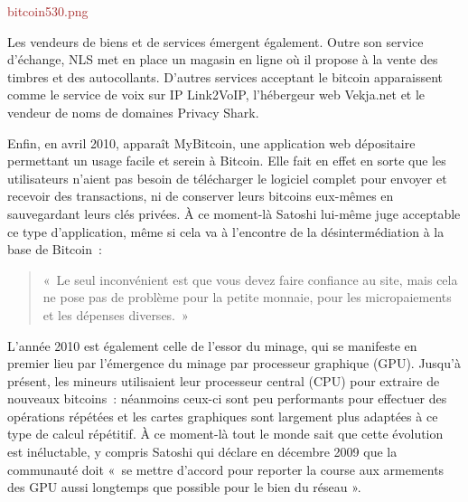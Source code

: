 \textcolor{brown}{bitcoin530.png}

Les vendeurs de biens et de services émergent également. Outre son service d'échange, NLS met en place un magasin en ligne où il propose à la vente des timbres et des autocollants. D'autres services acceptant le bitcoin apparaissent comme le service de voix sur IP Link2VoIP, l'hébergeur web Vekja.net et le vendeur de noms de domaines Privacy Shark.

Enfin, en avril 2010, apparaît MyBitcoin, une application web dépositaire permettant un usage facile et serein à Bitcoin. Elle fait en effet en sorte que les utilisateurs n'aient pas besoin de télécharger le logiciel complet pour envoyer et recevoir des transactions, ni de conserver leurs bitcoins eux-mêmes en sauvegardant leurs clés privées. À ce moment-là Satoshi lui-même juge acceptable ce type d'application, même si cela va à l'encontre de la désintermédiation à la base de Bitcoin~:

\begin{quote}
«~Le seul inconvénient est que vous devez faire confiance au site, mais cela ne pose pas de problème pour la petite monnaie, pour les micropaiements et les dépenses diverses.~»
\end{quote}


L'année 2010 est également celle de l'essor du minage, qui se manifeste en premier lieu par l'émergence du minage par processeur graphique (GPU). Jusqu'à présent, les mineurs utilisaient leur processeur central (CPU) pour extraire de nouveaux bitcoins~: néanmoins ceux-ci sont peu performants pour effectuer des opérations répétées et les cartes graphiques sont largement plus adaptées à ce type de calcul répétitif. À ce moment-là tout le monde sait que cette évolution est inéluctable, y compris Satoshi qui déclare en décembre 2009 que la communauté doit «~se mettre d'accord pour reporter la course aux armements des GPU aussi longtemps que possible pour le bien du réseau ».

